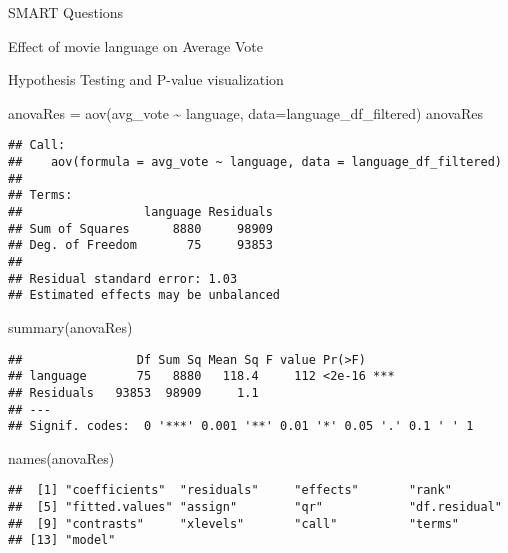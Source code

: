 \documentclass[
  ignorenonframetext,
]{beamer}
\newenvironment{Shaded}{\begin{snugshade}}{\end{snugshade}}
\newcommand{\AttributeTok}[1]{\textcolor[rgb]{0.77,0.63,0.00}{#1}}
\newcommand{\FloatTok}[1]{\textcolor[rgb]{0.00,0.00,0.81}{#1}}
\newcommand{\FunctionTok}[1]{\textcolor[rgb]{0.00,0.00,0.00}{#1}}
\newcommand{\NormalTok}[1]{#1}
\newcommand{\OtherTok}[1]{\textcolor[rgb]{0.56,0.35,0.01}{#1}}
\newcommand{\SpecialCharTok}[1]{\textcolor[rgb]{0.00,0.00,0.00}{#1}}
\begin{document}
\begin{frame}[fragile]{SMART Questions}
\begin{block}{Effect of movie language on Average Vote}
\begin{block}{Hypothesis Testing and P-value visualization}
\begin{Shaded}
\begin{Highlighting}[]
\NormalTok{anovaRes }\OtherTok{=} \FunctionTok{aov}\NormalTok{(avg\_vote }\SpecialCharTok{\textasciitilde{}}\NormalTok{ language, }\AttributeTok{data=}\NormalTok{language\_df\_filtered)}
\NormalTok{anovaRes }
\end{Highlighting}
\end{Shaded}

\begin{verbatim}
## Call:
##    aov(formula = avg_vote ~ language, data = language_df_filtered)
## 
## Terms:
##                 language Residuals
## Sum of Squares      8880     98909
## Deg. of Freedom       75     93853
## 
## Residual standard error: 1.03
## Estimated effects may be unbalanced
\end{verbatim}

\begin{Shaded}
\begin{Highlighting}[]
\FunctionTok{summary}\NormalTok{(anovaRes)}
\end{Highlighting}
\end{Shaded}

\begin{verbatim}
##                Df Sum Sq Mean Sq F value Pr(>F)    
## language       75   8880   118.4     112 <2e-16 ***
## Residuals   93853  98909     1.1                   
## ---
## Signif. codes:  0 '***' 0.001 '**' 0.01 '*' 0.05 '.' 0.1 ' ' 1
\end{verbatim}

\begin{Shaded}
\begin{Highlighting}[]
\FunctionTok{names}\NormalTok{(anovaRes)}
\end{Highlighting}
\end{Shaded}

\begin{verbatim}
##  [1] "coefficients"  "residuals"     "effects"       "rank"         
##  [5] "fitted.values" "assign"        "qr"            "df.residual"  
##  [9] "contrasts"     "xlevels"       "call"          "terms"        
## [13] "model"
\end{verbatim}

\begin{Shaded}
\end{Shaded}


\end{block}
\end{block}
\end{frame}
\end{document}
